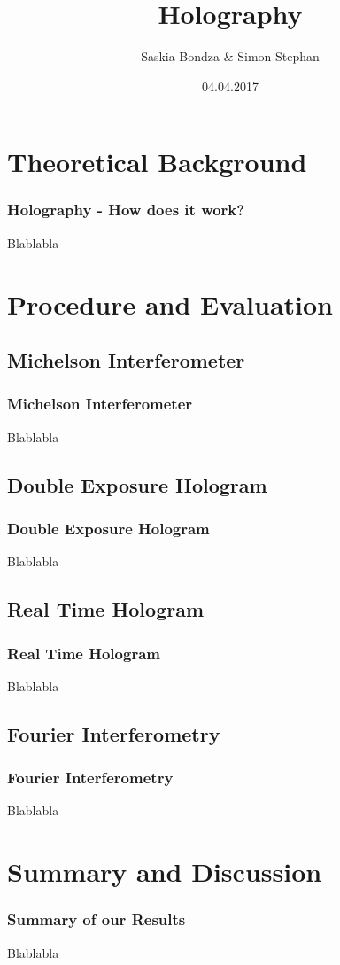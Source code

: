 \documentclass{beamer}
\title{Holography}
\author{Saskia Bondza \& Simon Stephan}
\date{04.04.2017}
\begin{document}
\maketitle
\frame{\tableofcontents}
\section{Theoretical Background}
\frame{\tableofcontents[currentsection]}
\begin{frame}
	\frametitle{Holography - How does it work?}
	Blablabla
\end{frame}
\section{Procedure and Evaluation}
\frame{\tableofcontents[currentsection]}
\subsection{Michelson Interferometer}
\frame{\tableofcontents[currentsubsection]}
\begin{frame}
	\frametitle{Michelson Interferometer}
	Blablabla
\end{frame}
\subsection{Double Exposure Hologram}
\frame{\tableofcontents[currentsubsection]}
\begin{frame}
	\frametitle{Double Exposure Hologram}
	Blablabla
\end{frame}
\subsection{Real Time Hologram}
\frame{\tableofcontents[currentsubsection]}
\begin{frame}
	\frametitle{Real Time Hologram}
	Blablabla
\end{frame}
\subsection{Fourier Interferometry}
\frame{\tableofcontents[currentsubsection]}
\begin{frame}
	\frametitle{Fourier Interferometry}
	Blablabla
\end{frame}
\section{Summary and Discussion}
\frame{\tableofcontents[currentsection]}
\begin{frame}
	\frametitle{Summary of our Results}
	Blablabla
\end{frame}
\end{document}
